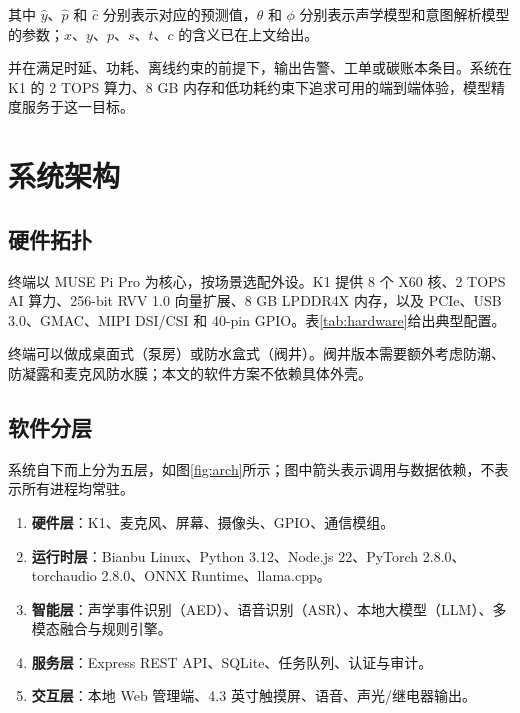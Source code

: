 \documentclass[UTF8,11pt,a4paper,fontset=none]{ctexart}
\begin{document}
其中 \(\hat{y}\)、\(\hat{p}\) 和 \(\hat{c}\) 分别表示对应的预测值，\(\theta\) 和 \(\phi\) 分别表示声学模型和意图解析模型的参数；\(x\)、\(y\)、\(p\)、\(s\)、\(t\)、\(c\) 的含义已在上文给出。

并在满足时延、功耗、离线约束的前提下，输出告警、工单或碳账本条目。系统在 K1 的 2 TOPS 算力、8 GB 内存和低功耗约束下追求可用的端到端体验，模型精度服务于这一目标。

\section{系统架构}
\label{sec:architecture}

\subsection{硬件拓扑}

终端以 MUSE Pi Pro 为核心，按场景选配外设。K1 提供 8 个 X60 核、2 TOPS AI 算力、256-bit RVV 1.0 向量扩展、8 GB LPDDR4X 内存，以及 PCIe、USB 3.0、GMAC、MIPI DSI/CSI 和 40-pin GPIO\cite{spacemit}。表\ref{tab:hardware}给出典型配置。


终端可以做成桌面式（泵房）或防水盒式（阀井）。阀井版本需要额外考虑防潮、防凝露和麦克风防水膜；本文的软件方案不依赖具体外壳。

\subsection{软件分层}

系统自下而上分为五层，如图\ref{fig:arch}所示；图中箭头表示调用与数据依赖，不表示所有进程均常驻。

\begin{enumerate}
  \item \textbf{硬件层}：K1、麦克风、屏幕、摄像头、GPIO、通信模组。
  \item \textbf{运行时层}：Bianbu Linux、Python 3.12、Node.js 22、PyTorch 2.8.0、torchaudio 2.8.0、ONNX Runtime、llama.cpp。
  \item \textbf{智能层}：声学事件识别（AED）、语音识别（ASR）、本地大模型（LLM）、多模态融合与规则引擎。
  \item \textbf{服务层}：Express REST API、SQLite、任务队列、认证与审计。
  \item \textbf{交互层}：本地 Web 管理端、4.3 英寸触摸屏、语音、声光/继电器输出。
\end{enumerate}
\end{document}

